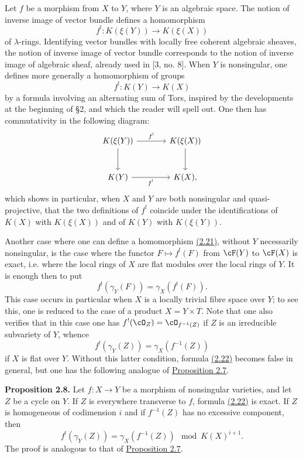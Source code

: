Let $f$ be a morphism from $X$ to $Y$, where $Y$ is an algebraic space. The notion of inverse image of vector bundle defines a homomorphism
\[
 f^!:K(\xi(Y))\longrightarrow K(\xi(X))
\]
of $\lambda$-rings. Identifying vector bundles with locally free coherent algebraic sheaves, the notion of inverse image of vector bundle corresponds to the notion of inverse image of algebraic sheaf, already used in [3, no. 8]. When $Y$ is nonsingular, one defines more generally a homomorphism of groups
\begin{equation}\tag{2.21}
 f^!:K(Y)\longrightarrow K(X)
\end{equation}
by a formula involving an alternating sum of Tors, inspired by the developments at the beginning of \S 2, and which the reader will spell out. One then has commutativity in the following diagram:
\[
\begin{tikzcd}[column sep=large,row sep=large]
K(\xi(Y)) \arrow[r,"f^!"] \arrow[d] & K(\xi(X)) \arrow[d]\\
K(Y) \arrow[r,"f^!"'] & K(X),
\end{tikzcd}
\]
which shows in particular, when $X$ and $Y$ are both nonsingular and quasi-projective, that the two definitions of $f^!$ coincide under the identifications of $K(X)$ with $K(\xi(X))$ and of $K(Y)$ with $K(\xi(Y))$.

Another case where one can define a homomorphism \hyperlink{sga6.e00.eq.2-21}{(2.21)}, without $Y$ necessarily nonsingular, is the case where the functor $F\mapsto f^!(F)$ from $\cF(Y)$ to $\cF(X)$ is exact, i.e. where the local rings of $X$ are flat modules over the local rings of $Y$. It is enough then to put
\[
 f^!(\gamma_Y(F))=\gamma_X(f^!(F)).
\]
This case occurs in particular when $X$ is a locally trivial fibre space over $Y$; to see this, one is reduced to the case of a product $X=Y\times T$. Note that one also verifies that in this case one has $f^!(\cO_Z)=\cO_{f^{-1}(Z)}$ if $Z$ is an irreducible subvariety of $Y$, whence
\begin{equation}\tag{2.22}
 f^!(\gamma_Y(Z))=\gamma_X(f^{-1}(Z))
\end{equation}
if $X$ is flat over $Y$. Without this latter condition, formula \hyperlink{sga6.e00.eq.2-22}{(2.22)} becomes false in general, but one has the following analogue of \hyperlink{sga6.e00.prop.2-7}{Proposition 2.7}.

\textbf{Proposition 2.8.} Let $f:X\to Y$ be a morphism of nonsingular varieties, and let $Z$ be a cycle on $Y$. If $Z$ is everywhere transverse to $f$, formula \hyperlink{sga6.e00.eq.2-22}{(2.22)} is exact. If $Z$ is homogeneous of codimension $i$ and if $f^{-1}(Z)$ has no excessive component, then
\begin{equation}\tag{2.23}
 f^!(\gamma_Y(Z))=\gamma_X(f^{-1}(Z))\mod K(X)^{i+1}.
\end{equation}
The proof is analogous to that of \hyperlink{sga6.e00.prop.2-7}{Proposition 2.7}.

